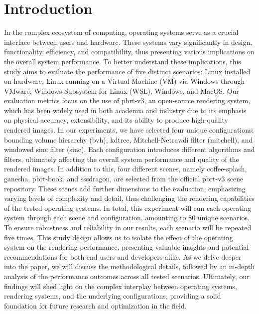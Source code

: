 \documentclass[conference]{IEEEtran}
\begin{document}
\section{Introduction}
In the complex ecosystem of computing, operating systems serve as a crucial interface between users and hardware. These systems vary significantly in design, functionality, efficiency, and compatibility, thus presenting various implications on the overall system performance. To better understand these implications, this study aims to evaluate the performance of five distinct scenarios: Linux installed on hardware, Linux running on a Virtual Machine (VM) via Windows through VMware, Windows Subsystem for Linux (WSL), Windows, and MacOS.
Our evaluation metrics focus on the use of pbrt-v3, an open-source rendering system, which has been widely used in both academia and industry due to its emphasis on physical accuracy, extensibility, and its ability to produce high-quality rendered images. In our experiments, we have selected four unique configurations: bounding volume hierarchy (bvh), kdtree, Mitchell-Netravali filter (mitchell), and windowed sinc filter (sinc). Each configuration introduces different algorithms and filters, ultimately affecting the overall system performance and quality of the rendered images.
In addition to this, four different scenes, namely coffee-splash, ganesha, pbrt-book, and sssdragon, are selected from the official pbrt-v3 scene repository. These scenes add further dimensions to the evaluation, emphasizing varying levels of complexity and detail, thus challenging the rendering capabilities of the tested operating systems.
In total, this experiment will run each operating system through each scene and configuration, amounting to 80 unique scenarios. To ensure robustness and reliability in our results, each scenario will be repeated five times. This study design allows us to isolate the effect of the operating system on the rendering performance, presenting valuable insights and potential recommendations for both end users and developers alike.
As we delve deeper into the paper, we will discuss the methodological details, followed by an in-depth analysis of the performance outcomes across all tested scenarios. Ultimately, our findings will shed light on the complex interplay between operating systems, rendering systems, and the underlying configurations, providing a solid foundation for future research and optimization in the field.

\end{document}
